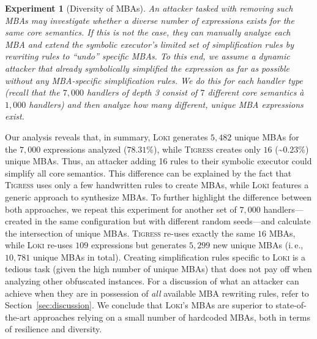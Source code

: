 \documentclass[letterpaper,twocolumn,10pt]{article}
\newcommand{\ie}{i.\,e.,\xspace}
\theoremstyle{customexample}
\theoremstyle{customexperiment}
\newtheorem{experiment}{Experiment}
\newcommand{\loki}{\textsc{Loki}\xspace}
\newcommand{\tigress}{\textsc{Tigress}\xspace}
\begin{document}
\begin{experiment}[Diversity of MBAs]\label{experiment:mba_diversity}
An attacker tasked with removing such MBAs may investigate whether a diverse number of expressions exists for the same core semantics. If this is not the case, they can manually analyze each MBA and extend the symbolic executor's limited set of simplification rules by rewriting rules to \enquote{undo} specific MBAs. 
To this end, we assume a dynamic attacker that already symbolically simplified the expression as far as possible without any MBA-specific simplification rules. We do this for each handler type (recall that the $7,000$ handlers of depth 3 consist of $7$ different core semantics à $1,000$ handlers) and then analyze how many different, unique MBA expressions exist.
\end{experiment}

Our analysis reveals that, in summary, \loki generates $5,482$ unique MBAs for the $7,000$ expressions analyzed ($78.31\%$), while \tigress creates only $16$  (\textasciitilde$0.23\%$) unique MBAs. Thus, an attacker adding 16 rules to their symbolic executor could simplify all core semantics.
This difference can be explained by the fact that \tigress uses only a few handwritten rules to create MBAs, while \loki features a generic approach to synthesize MBAs. To further highlight the difference between both approaches, we repeat this experiment for another set of $7,000$ handlers---created in the same configuration but with different random seeds---and calculate the intersection of unique MBAs. \tigress re-uses exactly the same $16$ MBAs, while \loki re-uses $109$ expressions but generates $5,299$ new unique MBAs (\ie $10,781$ unique MBAs in total). 
Creating simplification rules specific to \loki is a tedious task (given the high number of unique MBAs) that does not pay off when analyzing other obfuscated instances. 
For a discussion of what an attacker can achieve when they are in possession of \emph{all} available MBA rewriting rules, refer to Section~\ref{sec:discussion}. We conclude that \loki's MBAs are superior to state-of-the-art approaches relying on a small number of hardcoded MBAs, both in terms of resilience and diversity.
\end{document}
